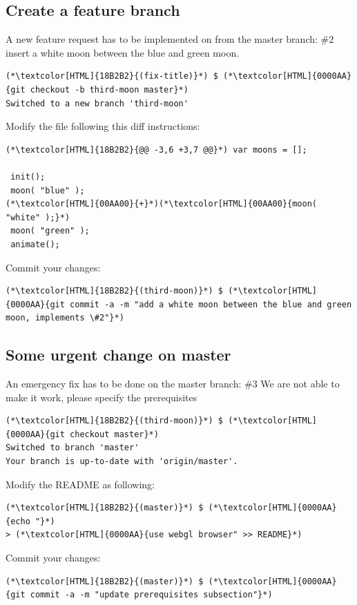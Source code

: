 \subsection{Create a feature branch}
\begin{frame}[fragile]
  \subslidetitle

  A new feature request has to be implemented on from the master branch:
  \newline \vspace{1em}
  \#2 insert a white moon between the blue and green moon.
  \begin{lstlisting}
(*\textcolor[HTML]{18B2B2}{(fix-title)}*) $ (*\textcolor[HTML]{0000AA}{git checkout -b third-moon master}*)
Switched to a new branch 'third-moon'
\end{lstlisting}

  Modify the  file following this diff instructions:
  \begin{lstlisting}
(*\textcolor[HTML]{18B2B2}{@@ -3,6 +3,7 @@}*) var moons = [];

 init();
 moon( "blue" );
(*\textcolor[HTML]{00AA00}{+}*)(*\textcolor[HTML]{00AA00}{moon( "white" );}*)
 moon( "green" );
 animate();
\end{lstlisting}

  Commit your changes:
  \begin{lstlisting}
(*\textcolor[HTML]{18B2B2}{(third-moon)}*) $ (*\textcolor[HTML]{0000AA}{git commit -a -m "add a white moon between the blue and green moon, implements \#2"}*)
\end{lstlisting}

\end{frame}


\subsection{Some urgent change on master}
\begin{frame}[fragile]
  \subslidetitle

  An emergency fix has to be done on the master branch:
  \newline \vspace{1em}
  \#3 We are not able to make it work, please specify the prerequisites
  \begin{lstlisting}
(*\textcolor[HTML]{18B2B2}{(third-moon)}*) $ (*\textcolor[HTML]{0000AA}{git checkout master}*)
Switched to branch 'master'
Your branch is up-to-date with 'origin/master'.
\end{lstlisting}

  Modify the README as following:
  \begin{lstlisting}
(*\textcolor[HTML]{18B2B2}{(master)}*) $ (*\textcolor[HTML]{0000AA}{echo "}*)
> (*\textcolor[HTML]{0000AA}{use webgl browser" >> README}*)
\end{lstlisting}

  Commit your changes:
  \begin{lstlisting}
(*\textcolor[HTML]{18B2B2}{(master)}*) $ (*\textcolor[HTML]{0000AA}{git commit -a -m "update prerequisites subsection"}*)
\end{lstlisting}

\end{frame}
